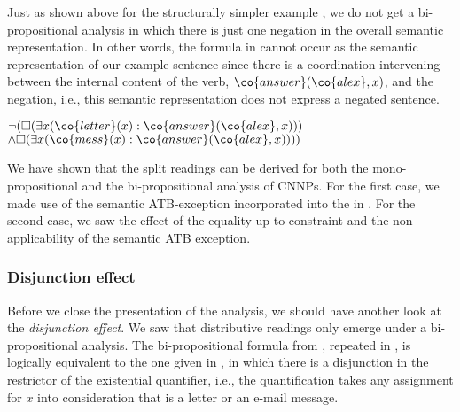 \documentclass[output=paper]{langsci/langscibook}
\begin{document}

Just as shown above for the structurally simpler example , we do not get a bi-propositional analysis in which there is just one negation in the overall semantic representation. In other words, the formula in  cannot occur as the semantic representation of our example sentence since there is a coordination intervening between the internal content of the verb, $\co{answer}(\co{alex},x)$, and the negation, i.e., this semantic representation does not express a negated sentence.

\ea \label{ATB-brauch-bi}
$\lnot (\Box(\exists x (\co{letter}(x) : \co{answer}(\co{alex},x)))$\\
\hspace*{\fill} $\land 
\Box(\exists x (\co{mess}(x) : \co{answer}(\co{alex},x))))$
\z 


\bigskip%
We have shown that the split readings can be derived for both the mono-propositional and the bi-propositional analysis of CNNPs. For the first case, we made use of the semantic ATB-exception incorporated into the \CCB{} in . For the second case, we saw the effect of the equality up-to constraint and the non-applicability of the semantic ATB exception.


\subsubsection{Disjunction effect}
\label{Sec-AnalysisDisjunctionEffect}

Before we close the presentation of the analysis, we should have another look at the \emph{disjunction effect}.
We saw that distributive readings only emerge under a bi-propositional analysis. 
 The bi-propositional formula from , repeated in , is logically equivalent to the one given in , in which there is a disjunction in the restrictor of the existential quantifier, i.e., the quantification takes any assignment for $x$ into consideration that is a letter or an e-mail message.
\end{document}
